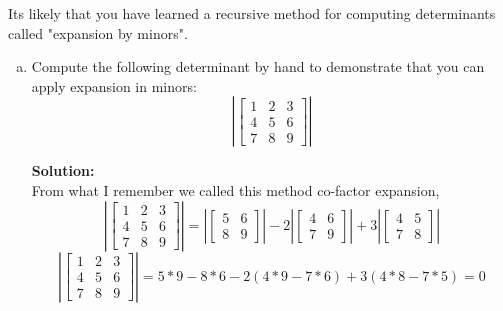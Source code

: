 \documentclass[12pt]{article}
\makeatletter
\theoremstyle{homework}
\newenvironment{exercise}[1]
{\def\@currentlabel{#1}\exercisecore}
{\endexercisecore}
\newcommand{\localhead}[1]{\par\smallskip\noindent\textbf{#1}\nobreak\\}%
\newcommand\solution{\localhead{Solution:}}
\makeatother
\begin{document}
\begin{exercise}{P6} Its likely that you have learned a recursive method for computing determinants called
  "expansion by minors".
  \begin{enumerate}[a.]
    \item Compute the following determinant by hand to demonstrate that you can apply expansion in minors:
          \begin{equation*}
            \left|\begin{bmatrix}
              1 & 2 & 3 \\
              4 & 5 & 6 \\
              7 & 8 & 9
            \end{bmatrix}\right|
          \end{equation*}
          \solution From what I remember we called this method co-factor expansion,
          \begin{equation*}
            \left|\begin{bmatrix}
              1 & 2 & 3 \\
              4 & 5 & 6 \\
              7 & 8 & 9
            \end{bmatrix}\right|
            = \left|\begin{bmatrix}
              5 & 6 \\
              8 & 9
            \end{bmatrix}\right|
            -2
            \left|\begin{bmatrix}
              4 & 6 \\
              7 & 9
            \end{bmatrix}\right|
            +3
            \left|\begin{bmatrix}
              4 & 5 \\
              7 & 8
            \end{bmatrix}\right|
          \end{equation*}
          \begin{equation*}
            \left|\begin{bmatrix}
              1 & 2 & 3 \\
              4 & 5 & 6 \\
              7 & 8 & 9
            \end{bmatrix}\right|
            = 5*9-8*6
            -2(4*9 - 7*6)
            +3(4*8 - 7*5)
            = 0
          \end{equation*}
          \vspace{.15in}


\end{enumerate}
\end{exercise}
\end{document}
